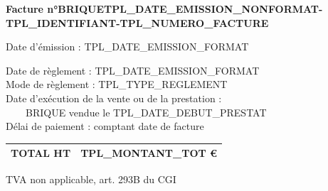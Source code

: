 \documentclass[10pt,a4paper]{article}
\begin{document}
\vspace{0.5cm}

\textbf{Facture n°BRIQUETPL_DATE_EMISSION_NONFORMAT-TPL_IDENTIFIANT-TPL_NUMERO_FACTURE}

Date d'émission : TPL_DATE_EMISSION_FORMAT\\

\vspace{0.5cm}


\vspace{0.5cm}

\begin{multicols}{2}

\begin{flushleft}

Date de règlement : TPL_DATE_EMISSION_FORMAT\\
Mode de règlement : TPL_TYPE_REGLEMENT\\
Date d’exécution de la vente ou de la prestation : \\
~~~~BRIQUE vendue le TPL_DATE_DEBUT_PRESTAT\\
Délai de paiement : comptant date de facture

\end{flushleft}

\columnbreak

\begin{flushright}
    \begin{tabular}{ |c|c| }
          \hline
          TOTAL HT & TPL_MONTANT_TOT \euro{} \\
            \hline
        \end{tabular}

    TVA non applicable, art. 293B du CGI
\end{flushright}

\end{multicols}
\end{document}
